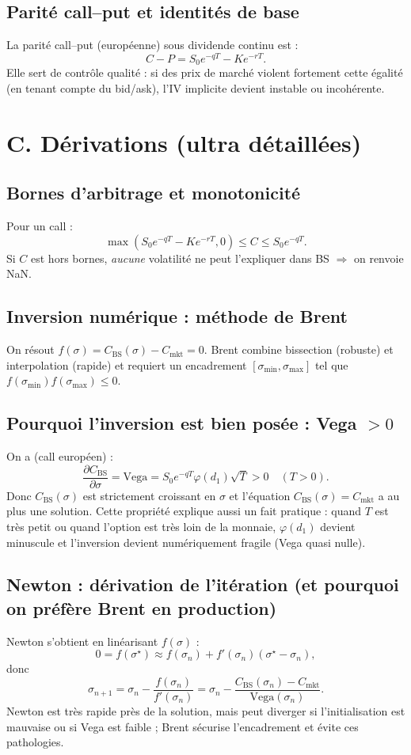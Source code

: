 \documentclass[11pt,a4paper]{report}
\theoremstyle{definition}
\theoremstyle{plain}
\theoremstyle{remark}
\newcommand{\1}{\mathbf{1}}
\begin{document}
\subsection*{Parité call--put et identités de base}
La parité call--put (européenne) sous dividende continu est :
\[
C - P = S_0e^{-qT} - Ke^{-rT}.
\]
Elle sert de contrôle qualité : si des prix de marché violent fortement cette égalité (en tenant compte du bid/ask), l'IV implicite devient instable ou incohérente.



\section{C. Dérivations (ultra détaillées)}
\subsection*{Bornes d'arbitrage et monotonicité}
Pour un call :
\[
\max(S_0e^{-qT}-Ke^{-rT},0)\le C \le S_0e^{-qT}.
\]
Si $C$ est hors bornes, \emph{aucune} volatilité ne peut l'expliquer dans BS $\Rightarrow$ on renvoie NaN.

\subsection*{Inversion numérique : méthode de Brent}
On résout $f(\sigma)=C_{\text{BS}}(\sigma)-C_{\text{mkt}}=0$.
Brent combine bissection (robuste) et interpolation (rapide) et requiert un encadrement $[\sigma_{\min},\sigma_{\max}]$ tel que $f(\sigma_{\min})f(\sigma_{\max})\le 0$.

\subsection*{Pourquoi l'inversion est bien posée : Vega $>0$}
On a (call européen) :
\[
\frac{\partial C_{\text{BS}}}{\partial \sigma}= \text{Vega} = S_0e^{-qT}\varphi(d_1)\sqrt{T} > 0 \quad (T>0).
\]
Donc $C_{\text{BS}}(\sigma)$ est strictement croissant en $\sigma$ et l'équation $C_{\text{BS}}(\sigma)=C_{\text{mkt}}$ a au plus une solution.
Cette propriété explique aussi un fait pratique : quand $T$ est très petit ou quand l'option est très loin de la monnaie, $\varphi(d_1)$ devient minuscule et l'inversion devient numériquement fragile (Vega quasi nulle).

\subsection*{Newton : dérivation de l'itération (et pourquoi on préfère Brent en production)}
Newton s'obtient en linéarisant $f(\sigma)$ :
\[
0=f(\sigma^\star)\approx f(\sigma_n)+f'(\sigma_n)(\sigma^\star-\sigma_n),
\]
donc
\[
\sigma_{n+1}=\sigma_n - \frac{f(\sigma_n)}{f'(\sigma_n)}=\sigma_n - \frac{C_{\text{BS}}(\sigma_n)-C_{\text{mkt}}}{\text{Vega}(\sigma_n)}.
\]
Newton est très rapide près de la solution, mais peut diverger si l'initialisation est mauvaise ou si Vega est faible ; Brent sécurise l'encadrement et évite ces pathologies.
\end{document}
